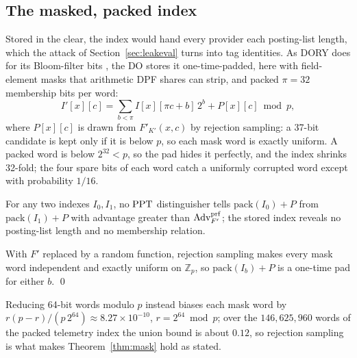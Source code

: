 \subsection{The masked, packed index}
\label{sec:mask}
Stored in the clear, the index would hand every provider each posting-list
length, which the attack of Section~\ref{sec:leakeval} turns into tag
identities. As DORY does for its Bloom-filter bits \citep{dory}, the DO stores
it one-time-padded, here with field-element masks that arithmetic DPF shares
can strip, and packed $\pi=32$ membership bits per word:
\begin{equation}
\label{eq:mask}
I'[x][c]=\textstyle\sum_{b<\pi}I[x][\pi c+b]\,2^b+P[x][c]\bmod p ,
\end{equation}
where $P[x][c]$ is drawn from $F'_{K'}(x,c)$ by rejection sampling: a 37-bit
candidate is kept only if it is below $p$, so each mask word is exactly
uniform. A packed word is below $2^{32}<p$, so the pad hides it perfectly, and
the index shrinks 32-fold; the four spare bits of each word catch a uniformly
corrupted word except with probability $1/16$.

\begin{theorem}
\label{thm:mask}
For any two indexes $I_0,I_1$, no $\mathrm{PPT}$ distinguisher tells
$\mathrm{pack}(I_0)+P$ from $\mathrm{pack}(I_1)+P$ with advantage greater than
$\mathrm{Adv}^{\mathrm{prf}}_{F'}$; the stored index reveals no posting-list length and no
membership relation.
\end{theorem}
\begin{pf}
With $F'$ replaced by a random function, rejection sampling makes every mask
word independent and exactly uniform on $\mathbb{Z}_p$, so
$\mathrm{pack}(I_b)+P$ is a one-time pad for either $b$. \qed
\end{pf}
Reducing 64-bit words modulo $p$ instead biases each mask word by
$r(p-r)/(p\,2^{64})\approx8.27\times10^{-10}$, $r=2^{64}\bmod p$; over the
$146{,}625{,}960$ words of the packed telemetry index the union bound is about
$0.12$, so rejection sampling is what makes Theorem~\ref{thm:mask} hold as
stated.

